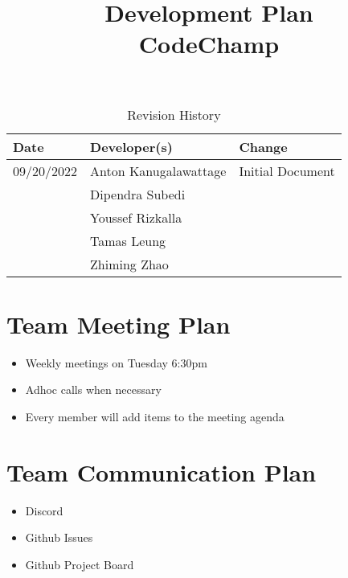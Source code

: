 \documentclass{article}
\title{Development Plan\\CodeChamp}
\author{\authname}
\date{}
\begin{document}
\begin{table}[hp]
\caption{Revision History} \label{TblRevisionHistory}
\begin{tabularx}{\textwidth}{llX}
\toprule
\textbf{Date} & \textbf{Developer(s)} & \textbf{Change}\\
\midrule
09/20/2022 & Anton Kanugalawattage & Initial Document\\
  & Dipendra Subedi & \\
  & Youssef Rizkalla &\\
  & Tamas Leung & \\
  & Zhiming Zhao & \\
\bottomrule
\end{tabularx}
\end{table}

\newpage

\maketitle


\section{Team Meeting Plan}
\begin{itemize}
\item Weekly meetings on Tuesday 6:30pm
\item Adhoc calls when necessary
\item Every member will add items to the meeting agenda
\end{itemize}

\section{Team Communication Plan}
\begin{itemize}
\item Discord
\item Github Issues
\item Github Project Board
\end{itemize}
\end{document}
